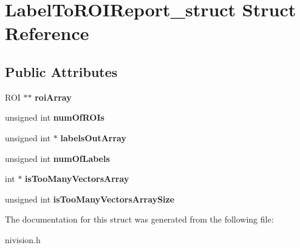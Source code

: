 \hypertarget{structLabelToROIReport__struct}{
\section{LabelToROIReport\_\-struct Struct Reference}
\label{structLabelToROIReport__struct}
}
\subsection*{Public Attributes}
\begin{DoxyCompactItemize}
\item 
\hypertarget{structLabelToROIReport__struct_acd81cc25c4c94ea7917b66ee9971e225}{
ROI $\ast$$\ast$ {\bfseries roiArray}}
\label{structLabelToROIReport__struct_acd81cc25c4c94ea7917b66ee9971e225}

\item 
\hypertarget{structLabelToROIReport__struct_a8a8be272c61f4fbdf30259f1234da76e}{
unsigned int {\bfseries numOfROIs}}
\label{structLabelToROIReport__struct_a8a8be272c61f4fbdf30259f1234da76e}

\item 
\hypertarget{structLabelToROIReport__struct_af580df161cb6b11d6d2ae4927c6d0b73}{
unsigned int $\ast$ {\bfseries labelsOutArray}}
\label{structLabelToROIReport__struct_af580df161cb6b11d6d2ae4927c6d0b73}

\item 
\hypertarget{structLabelToROIReport__struct_aa7bee26addf21879c3a5cf3fd53eb422}{
unsigned int {\bfseries numOfLabels}}
\label{structLabelToROIReport__struct_aa7bee26addf21879c3a5cf3fd53eb422}

\item 
\hypertarget{structLabelToROIReport__struct_a053e9a67c33fccf268a20da68e0ca333}{
int $\ast$ {\bfseries isTooManyVectorsArray}}
\label{structLabelToROIReport__struct_a053e9a67c33fccf268a20da68e0ca333}

\item 
\hypertarget{structLabelToROIReport__struct_aafb9679d020bb3d0da7569629fd3f1b7}{
unsigned int {\bfseries isTooManyVectorsArraySize}}
\label{structLabelToROIReport__struct_aafb9679d020bb3d0da7569629fd3f1b7}

\end{DoxyCompactItemize}


The documentation for this struct was generated from the following file:\begin{DoxyCompactItemize}
\item 
nivision.h\end{DoxyCompactItemize}
